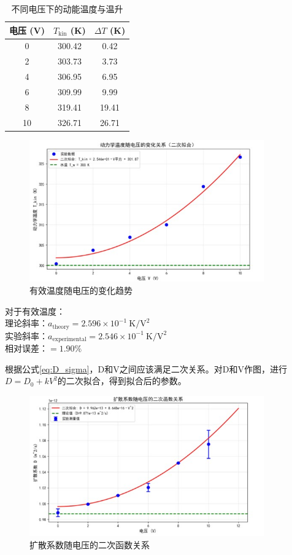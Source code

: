 \documentclass[a4paper]{report} %
\begin{document}
\begin{table}[H]
    \centering
    \caption{不同电压下的动能温度与温升}
    \begin{tabular}{ccc}
        \toprule
        电压 (V) & $T_{\text{kin}}$ (K) & $\Delta T$ (K) \\
        \midrule
        0  & 300.42 & 0.42 \\
        2  & 303.73 & 3.73 \\
        4  & 306.95 & 6.95 \\
        6  & 309.99 & 9.99 \\
        8  & 319.41 & 19.41 \\
        10 & 326.71 & 26.71 \\
        \bottomrule
    \end{tabular}
\end{table}
\begin{figure}[H]
    \centering
    \includegraphics[width=0.9\textwidth]{温度.jpg}
    \caption{有效温度随电压的变化趋势}
    \label{fig:trends}
\end{figure}
对于有效温度：\\
理论斜率：$a_{\text{theory}} = 2.596 \times 10^{-1} \ \text{K}/\text{V}^2$ \\ 
实验斜率：$a_{\text{experimental}} = 2.546 \times 10^{-1} \ \text{K}/\text{V}^2$ \\ 
相对误差：$= 1.90\%$\par
根据公式\eqref{eq:D_sigma}，D和V之间应该满足二次关系。对D和V作图，进行$D = D_0 + kV^2$的二次拟合，得到拟合后的参数。
\begin{figure}[H]
    \centering
    \includegraphics[width=0.9\textwidth]{二次拟合.jpg}
    \caption{扩散系数随电压的二次函数关系}
    \label{fig:fit2V}
\end{figure}
\end{document}
